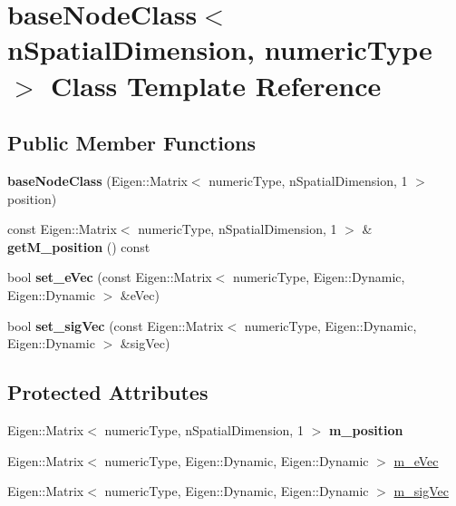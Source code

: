 \hypertarget{classbase_node_class}{}\section{base\+Node\+Class$<$ n\+Spatial\+Dimension, numeric\+Type $>$ Class Template Reference}
\label{classbase_node_class}
\subsection*{Public Member Functions}
\begin{DoxyCompactItemize}
\item 
\mbox{\label{classbase_node_class_a951ba5f8a8e7082ac978c1a3cffc6ccc}} 
{\bfseries base\+Node\+Class} (Eigen\+::\+Matrix$<$ numeric\+Type, n\+Spatial\+Dimension, 1 $>$ position)
\item 
\mbox{\label{classbase_node_class_ade0aa681b0ac36364b31a7fcf4b4c295}} 
const Eigen\+::\+Matrix$<$ numeric\+Type, n\+Spatial\+Dimension, 1 $>$ \& {\bfseries get\+M\+\_\+position} () const
\item 
\mbox{\label{classbase_node_class_afa6828b452178715f4609db7cd3b0afe}} 
bool {\bfseries set\+\_\+e\+Vec} (const Eigen\+::\+Matrix$<$ numeric\+Type, Eigen\+::\+Dynamic, Eigen\+::\+Dynamic $>$ \&e\+Vec)
\item 
\mbox{\label{classbase_node_class_af1de8165f05e483dd45d6d79058fcfb9}} 
bool {\bfseries set\+\_\+sig\+Vec} (const Eigen\+::\+Matrix$<$ numeric\+Type, Eigen\+::\+Dynamic, Eigen\+::\+Dynamic $>$ \&sig\+Vec)
\end{DoxyCompactItemize}
\subsection*{Protected Attributes}
\begin{DoxyCompactItemize}
\item 
\mbox{\label{classbase_node_class_a68f14d13ea4a416c943f67a60d3107aa}} 
Eigen\+::\+Matrix$<$ numeric\+Type, n\+Spatial\+Dimension, 1 $>$ {\bfseries m\+\_\+position}
\item 
Eigen\+::\+Matrix$<$ numeric\+Type, Eigen\+::\+Dynamic, Eigen\+::\+Dynamic $>$ \mbox{\hyperlink{classbase_node_class_a754f5d47539b21d91a48d600efa05b5a}{m\+\_\+e\+Vec}}
\item 
Eigen\+::\+Matrix$<$ numeric\+Type, Eigen\+::\+Dynamic, Eigen\+::\+Dynamic $>$ \mbox{\hyperlink{classbase_node_class_ad0381fa3d308b32934e3188bd7c2df84}{m\+\_\+sig\+Vec}}
\end{DoxyCompactItemize}


